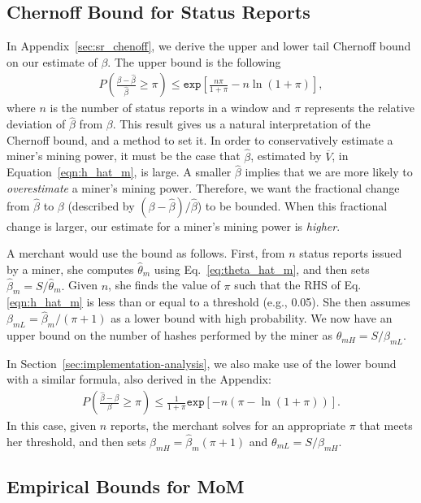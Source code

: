 \documentclass[10pt,sigconf]{acmart}
\newcommand{\1}{{\em (i)}}
\newcommand{\2}{{\em (ii)}}
\newcommand{\3}{{\em (iii)}}
\newcommand{\4}{{\em (iv)}}
\newcommand{\5}{{\em (v)}}
\begin{document}
\subsection{Chernoff Bound for Status Reports}\label{sec:chernoff}
In Appendix~\ref{sec:sr_chenoff}, we derive the upper and lower tail
Chernoff bound on our estimate of $\beta$. The upper bound is the
following
\begin{eqnarray}
 P\left(\frac{\beta-\hat{\beta}}{\hat{\beta}} \geq \pi \right) \leq \texttt{exp}\left[ \frac{n \pi}{1 + \pi} - n \ln(1 + \pi) \right], \end{eqnarray}
where $n$ is the number of status reports in a window and $\pi$
represents the relative deviation of $\hat{\beta}$ from $\beta$. This
result gives us a natural interpretation of the Chernoff bound, and a
method to set it. In order to conservatively estimate a miner's mining
power, it must be the case that $\hat{\beta}$, estimated by
$\overline{V}$, in Equation~\ref{eqn:h_hat_m}, is large. A smaller
$\hat{\beta}$ implies that we are more likely to \textit{overestimate}
a miner's mining power. Therefore, we want the fractional change from
$\hat{\beta}$ to $\beta$ (described by
$(\beta-\hat{\beta}) / \hat{\beta}$) to be bounded. When this
fractional change is larger, our estimate for a miner's mining power
is \textit{higher}.  

A merchant would use the bound as follows. First, from $n$ status reports issued by a miner, she computes $\hat{\theta}_m$  using Eq.~\ref{eq:theta_hat_m}, and then sets $\hat{\beta}_m=S/\hat{\theta}_m.$ Given $n$, she finds the value of $\pi$ such that the RHS of Eq.\ref{eqn:h_hat_m} is less than or equal to a threshold (e.g., 0.05). She then assumes $\beta_{mL}=\hat{\beta}_m/(\pi+1)$ as a lower bound with high probability. We now have  an upper bound on 
the number of hashes performed by the miner as $\theta_{mH}=S/\beta_{mL}$.


In Section~\ref{sec:implementation-analysis}, we also make use of the lower bound with a similar formula, also derived in the Appendix: 
\begin{eqnarray}
P\left(\frac{\hat{\beta}-\beta}{\beta} \geq \pi \right)
 \leq \frac{1}{1+\pi} \texttt{exp}\left[-n(\pi - \ln(1 + \pi))\right].
\end{eqnarray}
In this case, given $n$ reports, the merchant solves for an appropriate $\pi$ that meets her threshold,  and then sets $\beta_{mH}=\hat{\beta}_m(\pi+1)$ and 
$\theta_{mL}=S/\beta_{mH}$.

\subsection{Empirical Bounds for MoM}\label{sec:MoM-bound}
\end{document}
